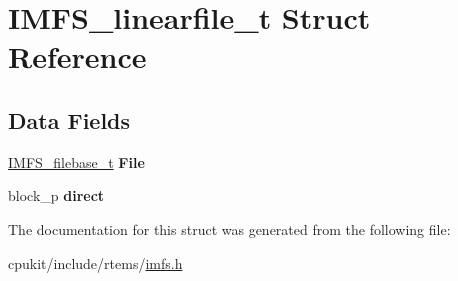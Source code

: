 \hypertarget{structIMFS__linearfile__t}{}\section{I\+M\+F\+S\+\_\+linearfile\+\_\+t Struct Reference}
\label{structIMFS__linearfile__t}
\subsection*{Data Fields}
\begin{DoxyCompactItemize}
\item 
\mbox{\label{structIMFS__linearfile__t_a2d4e1c1ab82795d8855f9c5ce4bdbfab}} 
\mbox{\hyperlink{structIMFS__filebase__t}{I\+M\+F\+S\+\_\+filebase\+\_\+t}} {\bfseries File}
\item 
\mbox{\label{structIMFS__linearfile__t_ac8f4f19a43a1f4db285084f947895e27}} 
block\+\_\+p {\bfseries direct}
\end{DoxyCompactItemize}


The documentation for this struct was generated from the following file\+:\begin{DoxyCompactItemize}
\item 
cpukit/include/rtems/\mbox{\hyperlink{imfs_8h}{imfs.\+h}}\end{DoxyCompactItemize}
